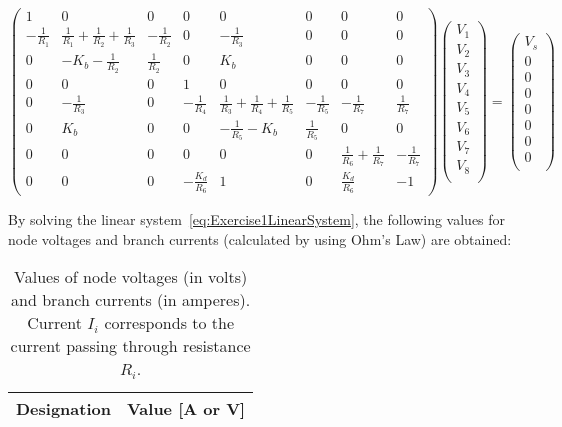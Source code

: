 \begin{equation}
  \begin{pmatrix}
    1 & 0 & 0 & 0 & 0 & 0 & 0 & 0 \\
    -\frac{1}{R_1} & \frac{1}{R_1}+\frac{1}{R_2}+\frac{1}{R_3} & -\frac{1}{R_2} & 0 & -\frac{1}{R_3} & 0 & 0 & 0 \\
    0 & -K_b-\frac{1}{R_2} & \frac{1}{R_2} & 0 & K_b & 0 & 0 & 0 \\
    0 & 0 & 0 & 1 & 0 & 0 & 0 & 0 \\
    0 & -\frac{1}{R_3} & 0 & -\frac{1}{R_4} & \frac{1}{R_3}+\frac{1}{R_4}+\frac{1}{R_5} & -\frac{1}{R_5} & -\frac{1}{R_7} & \frac{1}{R_7} \\
    0 & K_b & 0 & 0 & -\frac{1}{R_5}-K_b & \frac{1}{R_5} & 0 & 0 \\
    0 & 0 & 0 & 0 & 0 & 0 & \frac{1}{R_6}+\frac{1}{R_7} & -\frac{1}{R_7} \\
    0 & 0 & 0 & -\frac{K_d}{R_6} & 1 & 0 & \frac{K_d}{R_6} & -1
  \end{pmatrix}
  \begin{pmatrix}
    V_1  \\
    V_2  \\
    V_3  \\
    V_4  \\
    V_5  \\
    V_6  \\
    V_7  \\
    V_8  \\
  \end{pmatrix}
  =
  \begin{pmatrix}
    V_s \\
    0   \\
    0   \\
    0   \\
    0   \\
    0   \\
    0   \\
    0   \\
  \end{pmatrix}
  \label{eq:Exercise1LinearSystem}
\end{equation}

By solving the linear system~\ref{eq:Exercise1LinearSystem}, the following values for node voltages and branch currents (calculated by using Ohm's Law) are obtained:

\begin{table}[H]
  \centering
  \begin{tabular}{|c|c|}
    \hline
        {\bf Designation} & {\bf Value [A or V]} \\ \hline
        
  \end{tabular}
  \caption{Values of node voltages (in volts) and branch currents (in amperes). Current $I_i$ corresponds to the current passing through resistance $R_i$.}
  \label{tab:Exercise1Theoretical}
\end{table}


